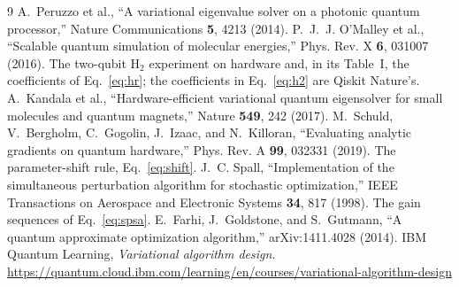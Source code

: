 \documentclass[11pt]{article}
\begin{document}
\begin{thebibliography}{9}
 A.~Peruzzo et al., ``A variational eigenvalue solver on a photonic quantum processor,'' Nature Communications \textbf{5}, 4213 (2014).
 P.~J.~J. O'Malley et al., ``Scalable quantum simulation of molecular energies,'' Phys. Rev. X \textbf{6}, 031007 (2016). The two-qubit $\mathrm{H}_2$ experiment on hardware and, in its Table~I, the coefficients of Eq.~\eqref{eq:hr}; the coefficients in Eq.~\eqref{eq:h2} are Qiskit Nature's.
 A.~Kandala et al., ``Hardware-efficient variational quantum eigensolver for small molecules and quantum magnets,'' Nature \textbf{549}, 242 (2017).
 M.~Schuld, V.~Bergholm, C.~Gogolin, J.~Izaac, and N.~Killoran, ``Evaluating analytic gradients on quantum hardware,'' Phys. Rev. A \textbf{99}, 032331 (2019). The parameter-shift rule, Eq.~\eqref{eq:shift}.
 J.~C. Spall, ``Implementation of the simultaneous perturbation algorithm for stochastic optimization,'' IEEE Transactions on Aerospace and Electronic Systems \textbf{34}, 817 (1998). The gain sequences of Eq.~\eqref{eq:spsa}.
 E.~Farhi, J.~Goldstone, and S.~Gutmann, ``A quantum approximate optimization algorithm,'' arXiv:1411.4028 (2014).
 IBM Quantum Learning, \emph{Variational algorithm design}. \url{https://quantum.cloud.ibm.com/learning/en/courses/variational-algorithm-design}
\end{thebibliography}
\end{document}
